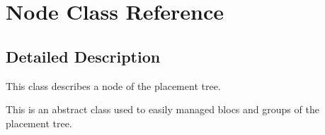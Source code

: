 \hypertarget{class_node}{}\section{Node Class Reference}
\label{class_node}


\subsection{Detailed Description}
This class describes a node of the placement tree.

This is an abstract class used to easily managed blocs and groups of the placement tree. 